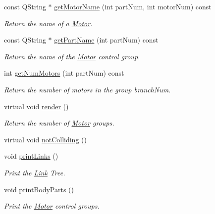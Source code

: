 \begin{DoxyCompactItemize}
\item 
const QString $\ast$ \hyperlink{class_robot_model_1_1_robot_a18b266083c6b87d05d1dc3479409e287}{getMotorName} (int partNum, int motorNum) const 
\begin{DoxyCompactList}\small\item\em Return the name of a \hyperlink{class_robot_model_1_1_motor}{Motor}. \item\end{DoxyCompactList}\item 
const QString $\ast$ \hyperlink{class_robot_model_1_1_robot_a108ec79a213fbc7655595f1716150436}{getPartName} (int partNum) const 
\begin{DoxyCompactList}\small\item\em Return the name of the \hyperlink{class_robot_model_1_1_motor}{Motor} control group. \item\end{DoxyCompactList}\item 
int \hyperlink{class_robot_model_1_1_robot_ac291608df7ce0cbe818d2da837ca008a}{getNumMotors} (int partNum) const 
\begin{DoxyCompactList}\small\item\em Return the number of motors in the group branchNum. \item\end{DoxyCompactList}\item 
virtual void \hyperlink{class_robot_model_1_1_robot_a47e480a4cad58266d12efce34f3fb563}{render} ()
\begin{DoxyCompactList}\small\item\em Return the number of \hyperlink{class_robot_model_1_1_motor}{Motor} groups. \item\end{DoxyCompactList}\item 
virtual void \hyperlink{class_robot_model_1_1_robot_af9d5c7808f2d11ec66d905bb8606447e}{notColliding} ()
\item 
void \hyperlink{class_robot_model_1_1_robot_a791f90ebca15e9a1e61e9e903f7dc594}{printLinks} ()
\begin{DoxyCompactList}\small\item\em Print the \hyperlink{class_robot_model_1_1_link}{Link} Tree. \item\end{DoxyCompactList}\item 
void \hyperlink{class_robot_model_1_1_robot_ad67fe62de4ea2b7b6da0521fc0bf0e5a}{printBodyParts} ()
\begin{DoxyCompactList}\small\item\em Print the \hyperlink{class_robot_model_1_1_motor}{Motor} control groups. \item\end{DoxyCompactList}\item 

\end{DoxyCompactItemize}
